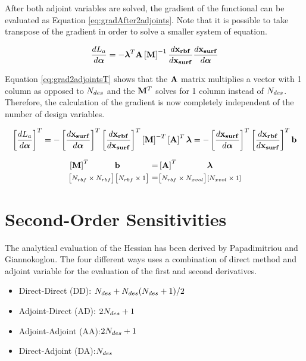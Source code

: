 \documentclass[letterpaper,12pt,]{article}
\begin{document}
After both adjoint variables are solved, the gradient of the functional can be evaluated as Equation \ref{eq:gradAfter2adjoints}.
Note that it is possible to take transpose of the gradient in order to solve a smaller system of equation.

\begin{equation}
	\dfrac{dL_a}{d\boldsymbol{\alpha}}
	=
	-\boldsymbol{\lambda}^T
	\mathbf{A}
	\left[\mathbf{M}\right]^{-1}
	\dfrac{d\mathbf{x_{rbf}}}{d\mathbf{x_{surf}}}
	\dfrac{d\mathbf{x_{surf}}}{d\boldsymbol{\alpha}}
\label{eq:gradAfter2adjoints}
\end{equation}

Equation \ref{eq:grad2adjointsT} shows that the $\mathbf{A}$ matrix multiplies a vector with 1 column as opposed to $N_{des}$ and the $\mathbf{M}^T$ solves for 1 column instead of $N_{des}$.
Therefore, the calculation of the gradient is now completely independent of the number of design variables.

\begin{equation}
	\left[\dfrac{dL_a}{d\boldsymbol{\alpha}}\right]^T
	=
	-\left[\dfrac{d\mathbf{x_{surf}}}{d\boldsymbol{\alpha}}\right]^{T}
	\left[\dfrac{d\mathbf{x_{rbf}}}{d\mathbf{x_{surf}}}\right]^{T}
	\left[\mathbf{M}\right]^{-T}
	\left[\mathbf{A}\right]^{T}
	{\boldsymbol{\lambda}}
	=
	-\left[\dfrac{d\mathbf{x_{surf}}}{d\boldsymbol{\alpha}}\right]^{T}
	\left[\dfrac{d\mathbf{x_{rbf}}}{d\mathbf{x_{surf}}}\right]^{T}
	\mathbf{b}
\label{eq:grad2adjointsT}
\end{equation}

\begin{equation}
\begin{alignedat}{5}
	&\left[\mathbf{M}\right]^{T}
	&&\mathbf{b}
	&&=
	&&\left[\mathbf{A}\right]^{T}
	&&{\boldsymbol{\lambda}}
\\	                   
	&\text{\footnotesize$\left[N_{rbf} \times N_{rbf} \right]$}
	&&\text{\footnotesize$\left[ N_{rbf} \times 1 \right]$}
	&&=
	&&\text{\footnotesize$\left[ N_{rbf} \times N_{xvol} \right]$}
	&&\text{\footnotesize$\left[ N_{xvol} \times 1 \right]$}
\label{eq:meshadjointb}
\end{alignedat}
\end{equation}

\section*{Second-Order Sensitivities}

The analytical evaluation of the Hessian has been derived by Papadimitriou and Giannokoglou.
The four different ways uses a combination of direct method and adjoint variable for the evaluation of the first and second derivatives.
\begin{itemize}
\item Direct-Direct (DD): $N_{des} + N_{des}(N_{des} + 1)/2$
\item Adjoint-Direct (AD): $2N_{des} + 1$
\item Adjoint-Adjoint (AA):$2N_{des} + 1$
\item Direct-Adjoint (DA):$N_{des}$
\end{itemize}
\end{document}
